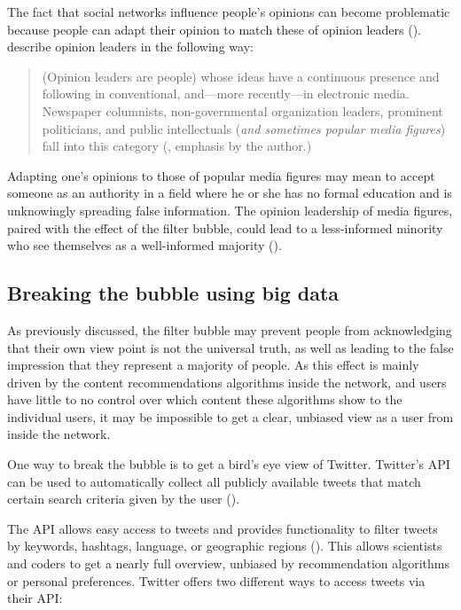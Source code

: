 The fact that social networks influence people's opinions can become problematic because people can adapt their opinion to match these of opinion leaders (\cite{altafiniDynamicsOpinionForming2012}). \citeauthor{gokceTwitterPoliticsIdentifying2014} describe opinion leaders in the following way: 
\begin{quote}
    (Opinion leaders are people) whose ideas have a continuous presence and following in conventional, and—more recently—in electronic media. Newspaper columnists, non-governmental organization leaders, prominent politicians, and public intellectuals (\emph{and sometimes popular media ﬁgures}) fall into this category (\cite[673]{gokceTwitterPoliticsIdentifying2014}, emphasis by the author.)
\end{quote}

Adapting one's opinions to those of popular media figures may mean to accept someone as an authority in a field where he or she has no formal education and is unknowingly spreading false information. The opinion leadership of media figures, paired with the effect of the filter bubble, could lead to a less-informed minority who see themselves as a well-informed majority (\cite{moscoviciSilentMajoritiesLoud1991}).


\subsection{Breaking the bubble using big data}
As previously discussed, the filter bubble may prevent people from acknowledging that their own view point is not the universal truth, as well as leading to the false impression that they represent a majority of people. As this effect is mainly driven by the content recommendations algorithms inside the network, and users have little to no control over which content these algorithms show to the individual users, it may be impossible to get a clear, unbiased view as a user from inside the network.

One way to break the bubble is to get a bird's eye view of Twitter. Twitter's API can be used to automatically collect all publicly available tweets that match certain search criteria given by the user (\cite{twitterinc.TwitterAPIs}).

The API allows easy access to tweets and provides functionality to filter tweets by keywords, hashtags, language, or geographic regions (\cite{bello2017detecting}). This allows scientists and coders to get a nearly full overview, unbiased by recommendation algorithms or personal preferences. Twitter offers two different ways to access tweets via their API:


